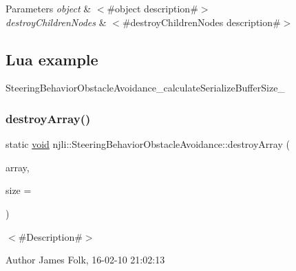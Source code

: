 \begin{DoxyParams}{Parameters}
{\em object} & $<$\#object description\#$>$ \\
\hline
{\em destroy\+Children\+Nodes} & $<$\#destroy\+Children\+Nodes description\#$>$\\
\hline
\end{DoxyParams}
\hypertarget{classnjli_1_1_steering_behavior_wander_ex1}{}\subsection{Lua example}\label{classnjli_1_1_steering_behavior_wander_ex1}

\begin{DoxyCodeInclude}
\end{DoxyCodeInclude}
Steering\+Behavior\+Obstacle\+Avoidance\+\_\+calculate\+Serialize\+Buffer\+Size\+\_\+ \mbox{\label{classnjli_1_1_steering_behavior_obstacle_avoidance_aa410ec99d4715bfd40e7b644c93583b8}} 
\subsubsection{\texorpdfstring{destroy\+Array()}{destroyArray()}}
{\footnotesize\ttfamily static \mbox{\hyperlink{_thread_8h_af1e856da2e658414cb2456cb6f7ebc66}{void}} njli\+::\+Steering\+Behavior\+Obstacle\+Avoidance\+::destroy\+Array (\begin{DoxyParamCaption}\item[{\mbox{\hyperlink{classnjli_1_1_steering_behavior_obstacle_avoidance}{Steering\+Behavior\+Obstacle\+Avoidance}} $\ast$$\ast$}]{array,  }\item[{const \mbox{\hyperlink{_util_8h_a10e94b422ef0c20dcdec20d31a1f5049}{u32}}}]{size = {} }\end{DoxyParamCaption})\hspace{0.3cm}{\ttfamily [static]}}



$<$\#\+Description\#$>$ 

\begin{DoxyAuthor}{Author}
James Folk, 16-\/02-\/10 21\+:02\+:13
\end{DoxyAuthor}

